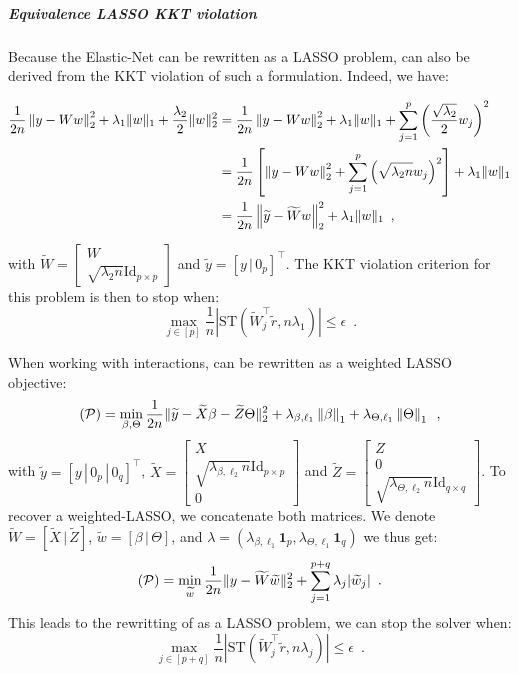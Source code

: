 \documentclass[a4]{article}
\begin{document}
\subparagraph{Equivalence LASSO KKT violation}

Because the Elastic-Net can be rewritten as a LASSO problem,  can also be derived from the KKT violation of such a formulation.
Indeed, we have:

\begin{align*}
	\frac{1}{2n}\left \lVert y-Ww \right \rVert_2^2 + \lambda_1 \|w\|_1 + \frac{\lambda_2}{2}\|w\|^2_2
	& = \frac{1}{2n}\left \lVert y-Ww \right \rVert_2^2 + \lambda_1 \|w\|_1 + \sum_{j=1}^p\left(\frac{\sqrt{\lambda_2}}{2}w_j\right)^2 \\
	& = \frac{1}{2n}\left[\left \lVert y-Ww \right \rVert_2^2 + \sum_{j=1}^p\left(\sqrt{\lambda_2 n}w_j\right)^2\right] + \lambda_1 \|w\|_1  \\
	& = \frac{1}{2n}\left \lVert \widetilde y - \widetilde Ww \right \rVert_2^2 + \lambda_1 \|w\|_1 \enspace,
\end{align*}

with $\widetilde W=\begin{bmatrix} W \\ \sqrt{\lambda_2 n}\mathrm{Id}_{p\times p}\end{bmatrix}$ and $\widetilde y = [y \,|\, 0_p ]^\top$.
The KKT violation criterion for this problem is then to stop when:
\[\max_{j\in [p]}  \frac{1}{n} \left|\mathrm{ST}\left(\widetilde W_j^\top\widetilde r, n\lambda_1 \right)\right|\leq \epsilon\enspace.\]

When working with interactions,  can be rewritten as a weighted LASSO objective:
\[(\mathcal{P}) = \min_{\beta, \Theta}\frac{1}{2n} \|\widetilde y - \widetilde X \beta - \widetilde Z\Theta\|_2^2 + \lambda_{\beta, \ell_1} \left \lVert \beta \right \rVert_1 + \lambda_{\Theta, \ell_1} \left \lVert \Theta \right \rVert_1\enspace,\]
with $\widetilde y=[y\,|\, 0_p \,|\, 0_q]^\top$, $\widetilde X = \begin{bmatrix} X \\ \sqrt{\lambda_{\beta, \ell_2} n}\mathrm{Id}_{p\times p}\\ 0 \end{bmatrix}$ and $\widetilde Z = \begin{bmatrix} Z \\ 0 \\ \sqrt{\lambda_{\Theta, \ell_2} n}\mathrm{Id}_{q\times q} \end{bmatrix}$.
To recover a weighted-LASSO, we concatenate both matrices. We denote $\widetilde W = [\widetilde X \,|\, \widetilde Z]$, $\widetilde w = [\beta \,|\, \Theta]$, and $\lambda=(\lambda_{\beta, \ell_1}\mathbf{1}_p, \lambda_{\Theta, \ell_1}\mathbf{1}_q)$ we thus get:
\[(\mathcal{P}) = \min_{\widetilde w}\frac{1}{2n} \| y - \widetilde W \widetilde w\|_2^2 + \sum_{j=1}^{p+q} \lambda_j |\widetilde w_j|\enspace.\]
This leads to the rewritting of  as a LASSO problem, we can stop the solver when:
\[\max_{j\in [p+q]} \frac{1}{n} \left| \mathrm{ST}\left( \widetilde W_j^\top \widetilde r, n\lambda_j\right)\right|\leq \epsilon\enspace. \]
\end{document}
